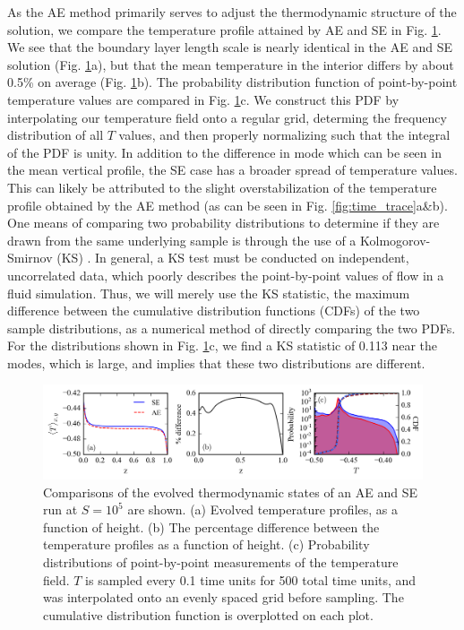\documentclass[aps, pre, onecolumn, nofootinbib, notitlepage, groupedaddress, amsfonts, amssymb, amsmath, longbibliography]{revtex4-1}
\begin{document}
As the AE method primarily serves to adjust the thermodynamic structure of the
solution, we compare the temperature profile attained by AE and SE in 
Fig. \ref{fig:temp_comparison}.  We see that the boundary layer length scale is 
nearly identical in the AE and SE solution (Fig. \ref{fig:temp_comparison}a), but that
the mean temperature in the interior differs by about 0.5\% on average
(Fig. \ref{fig:temp_comparison}b). The probability distribution function of point-by-point
temperature values are compared in Fig. \ref{fig:temp_comparison}c.  We construct
this PDF by interpolating our temperature field onto a regular grid, determing the
frequency distribution of all $T$ values, and then properly normalizing such that
the integral of the PDF is unity.  In addition to the
difference in mode which can be seen in the mean vertical profile, the SE case
has a broader spread of temperature values.  This can likely be attributed to the
slight overstabilization of the temperature profile obtained by the AE method
(as can be seen in Fig. \ref{fig:time_trace}a\&b).  One means of comparing two
probability distributions to determine if they are drawn from the same underlying
sample is through the use of a Kolmogorov-Smirnov (KS) \cite{wall&jenkins2012}.
In general, a KS test must be conducted on independent, uncorrelated data, which
poorly describes the point-by-point values of flow in a fluid simulation. Thus,
we will merely use the KS statistic, the maximum difference
between the cumulative distribution functions (CDFs) of the two sample distributions,
as a numerical method of directly comparing the two PDFs.  For the distributions
shown in Fig. \ref{fig:temp_comparison}c,
we find a KS statistic of 0.113 near the modes, which is large, and implies that
these two distributions are different.




\begin{figure}[t]
\includegraphics[width=\textwidth]{./figs/temp_comparison.png}
\caption{Comparisons of the evolved thermodynamic states of an AE and SE run
at $S = 10^{5}$ are shown.  (a) Evolved temperature profiles, as a function of height.
(b) The percentage difference between the temperature profiles as a function of height.
(c) Probability distributions of point-by-point measurements of the temperature field.
$T$ is sampled every 0.1 time units for 500 total time units,
and was interpolated onto an evenly spaced grid before sampling.
The cumulative distribution function is overplotted on each plot. 
\label{fig:temp_comparison} }
\end{figure}
\end{document}

